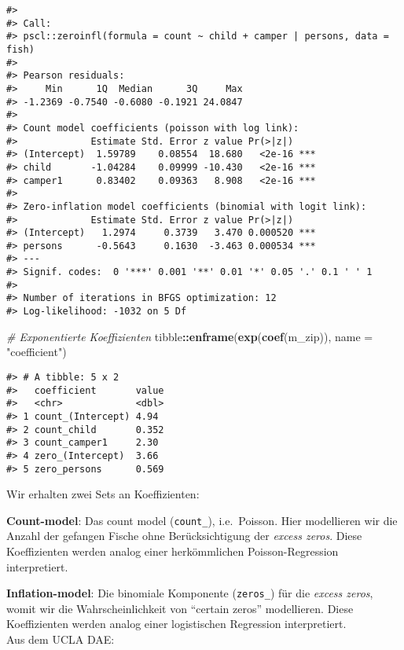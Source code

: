 \documentclass[ngerman,a4paper,]{scrartcl}
\newenvironment{Shaded}{\begin{snugshade}}{\end{snugshade}}
\newcommand{\CommentTok}[1]{\textcolor[rgb]{0.56,0.35,0.01}{\textit{#1}}}
\newcommand{\DataTypeTok}[1]{\textcolor[rgb]{0.13,0.29,0.53}{#1}}
\newcommand{\KeywordTok}[1]{\textcolor[rgb]{0.13,0.29,0.53}{\textbf{#1}}}
\newcommand{\NormalTok}[1]{#1}
\newcommand{\OperatorTok}[1]{\textcolor[rgb]{0.81,0.36,0.00}{\textbf{#1}}}
\newcommand{\StringTok}[1]{\textcolor[rgb]{0.31,0.60,0.02}{#1}}
\theoremstyle{definition}
\theoremstyle{definition}
\theoremstyle{definition}
\theoremstyle{remark}
\begin{document}
\begin{verbatim}
#> 
#> Call:
#> pscl::zeroinfl(formula = count ~ child + camper | persons, data = fish)
#> 
#> Pearson residuals:
#>     Min      1Q  Median      3Q     Max 
#> -1.2369 -0.7540 -0.6080 -0.1921 24.0847 
#> 
#> Count model coefficients (poisson with log link):
#>             Estimate Std. Error z value Pr(>|z|)    
#> (Intercept)  1.59789    0.08554  18.680   <2e-16 ***
#> child       -1.04284    0.09999 -10.430   <2e-16 ***
#> camper1      0.83402    0.09363   8.908   <2e-16 ***
#> 
#> Zero-inflation model coefficients (binomial with logit link):
#>             Estimate Std. Error z value Pr(>|z|)    
#> (Intercept)   1.2974     0.3739   3.470 0.000520 ***
#> persons      -0.5643     0.1630  -3.463 0.000534 ***
#> ---
#> Signif. codes:  0 '***' 0.001 '**' 0.01 '*' 0.05 '.' 0.1 ' ' 1 
#> 
#> Number of iterations in BFGS optimization: 12 
#> Log-likelihood: -1032 on 5 Df
\end{verbatim}

\begin{Shaded}
\begin{Highlighting}[]
\CommentTok{# Exponentierte Koeffizienten}
\NormalTok{tibble}\OperatorTok{::}\KeywordTok{enframe}\NormalTok{(}\KeywordTok{exp}\NormalTok{(}\KeywordTok{coef}\NormalTok{(m_zip)), }\DataTypeTok{name =} \StringTok{"coefficient"}\NormalTok{)}
\end{Highlighting}
\end{Shaded}

\begin{verbatim}
#> # A tibble: 5 x 2
#>   coefficient       value
#>   <chr>             <dbl>
#> 1 count_(Intercept) 4.94 
#> 2 count_child       0.352
#> 3 count_camper1     2.30 
#> 4 zero_(Intercept)  3.66 
#> 5 zero_persons      0.569
\end{verbatim}

Wir erhalten zwei Sets an Koeffizienten:

\textbf{Count-model}: Das count model (\texttt{count\_}), i.e.~Poisson. Hier modellieren wir die Anzahl der gefangen Fische ohne Berücksichtigung der \emph{excess zeros}. Diese Koeffizienten werden analog einer herkömmlichen Poisson-Regression interpretiert.

\textbf{Inflation-model}: Die binomiale Komponente (\texttt{zeros\_}) für die \emph{excess zeros}, womit wir die Wahrscheinlichkeit von \enquote{certain zeros} modellieren. Diese Koeffizienten werden analog einer logistischen Regression interpretiert.\\
Aus dem UCLA DAE:
\end{document}
